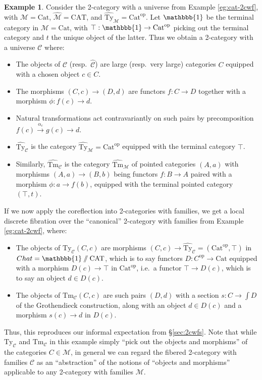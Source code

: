 \documentclass[10pt]{article}
\theoremstyle{definition}
\newtheorem{example}{Example}
\newcommand\op{^{\mathrm{op}}}
\newcommand\Cat{\mathrm{Cat}}
\newcommand\CAT{\mathrm{CAT}}
\newcommand\M{\mathcal{M}}
\newcommand\Mhat{\widehat{\mathcal{M}}}
\newcommand\Mtyhat{{\widehat{\mathrm{Ty}}_{\M}}}
\newcommand\Mtmhat{{\widehat{\mathrm{Tm}}_{\M}}}
\newcommand\C{\mathcal{C}}
\newcommand\Chat{{\widehat{\mathcal{C}}}}
\newcommand\Cty{\mathrm{Ty}_{\C}}
\newcommand\Ctm{\mathrm{Tm}_{\C}}
\newcommand\Ctyhat{{\widehat{\mathrm{Ty}}}_{\C}}
\newcommand\Ctmhat{{\widehat{\mathrm{Tm}}}_{\C}}
\newcommand\one{\mathbbb{1}}
\begin{document}
\begin{example}
  Consider the 2-category with a universe from Example \ref{eg:cat-2cwf}, with $\M=\Cat$, $\Mhat = \CAT$, and $\Mtyhat = \Cat\op$.
  Let $\one$ be the terminal category in $\M=\Cat$, with $\top:\one \to \Cat\op$ picking out the terminal category and $t$ the unique object of the latter.
  Thus we obtain a 2-category with a universe $\C$ where:
  \begin{itemize}
  \item The objects of $\C$ (resp.\ $\Chat$) are large (resp.\ very large) categories $C$ equipped with a chosen object $c\in C$.
  \item The morphisms $(C,c) \to (D,d)$ are functors $f:C\to D$ together with a morphism $\phi :f(c) \to d$.
  \item Natural transformations act contravariantly on such pairs by precomposition $f(c) \xrightarrow{\alpha_c} g(c) \to d$.
  \item $\Ctyhat$ is the category $\Mtyhat = \Cat\op$ equipped with the terminal category $\top$.
  \item Similarly, $\Ctmhat$ is the category $\Mtmhat$ of pointed categories $(A,a)$ with morphisms $(A,a) \to (B,b)$ being functors $f:B\to A$ paired with a morphism $\phi : a\to f(b)$, equipped with the terminal pointed category $(\top,t)$.
  \end{itemize}
  If we now apply the coreflection into 2-categories with families, we get a local discrete fibration over the ``canonical'' 2-category with families from Example \ref{eg:cat-2cwf}, where:
  \begin{itemize}
  \item The objects of $\Cty(C,c)$ are morphisms $(C,c) \to \Ctyhat = (\Cat\op,\top)$ in $Chat = \one\sslash\CAT$, which is to say functors $D:C\op\to \Cat$ equipped with a morphism $D(c) \to \top$ in $\Cat\op$, i.e.\ a functor $\top \to D(c)$, which is to say an object $d\in D(c)$.
  \item The objects of $\Ctm(C,c)$ are such pairs $(D,d)$ with a section $s:C\to \int D$ of the Grothendieck construction, along with an object $d\in D(c)$ and a morphism $s(c) \to d$ in $D(c)$.
  \end{itemize}
  Thus, this reproduces our informal expectation from \S\ref{sec:2cwfs}.
  Note that while $\Cty$ and $\Ctm$ in this example simply ``pick out the objects and morphisms'' of the categories $C\in\M$, in general we can regard the fibered 2-category with families $\C$ as an ``abstraction'' of the notions of ``objects and morphisms'' applicable to any 2-category with families $\M$.
\end{example}



\end{document}
